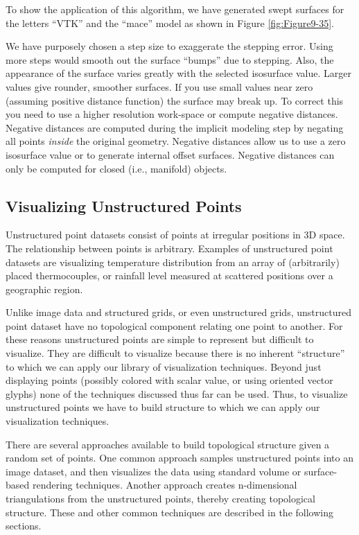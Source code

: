 To show the application of this algorithm, we have generated swept surfaces for the letters ``VTK'' and the ``mace'' model as shown in Figure \ref{fig:Figure9-35}.

We have purposely chosen a step size to exaggerate the stepping error. Using more steps would smooth out the surface ``bumps'' due to stepping. Also, the appearance of the surface varies greatly with the selected isosurface value. Larger values give rounder, smoother surfaces. If you use small values near zero (assuming positive distance function) the surface may break up. To correct this you need to use a higher resolution work-space or compute negative distances. Negative distances are computed during the implicit modeling step by negating all points \emph{inside} the original geometry. Negative distances allow us to use a zero isosurface value or to generate internal offset surfaces. Negative distances can only be computed for closed (i.e., manifold) objects.

\subsection{Visualizing Unstructured Points}
\label{subsec:visualizing_unstructured_points}

Unstructured point datasets consist of points at irregular positions in 3D space. The relationship between points is arbitrary. Examples of unstructured point datasets are visualizing temperature distribution from an array of (arbitrarily) placed thermocouples, or rainfall level measured at scattered positions over a geographic region.

Unlike image data and structured grids, or even unstructured grids, unstructured point dataset have no topological component relating one point to another. For these reasons unstructured points are simple to represent but difficult to visualize. They are difficult to visualize because there is no inherent ``structure'' to which we can apply our library of visualization techniques. Beyond just displaying points (possibly colored with scalar value, or using oriented vector glyphs) none of the techniques discussed thus far can be used. Thus, to visualize unstructured points we have to build structure to which we can apply our visualization techniques.

There are several approaches available to build topological structure given a random set of points. One common approach samples unstructured points into an image dataset, and then visualizes the data using standard volume or surface-based rendering techniques. Another approach creates n-dimensional triangulations from the unstructured points, thereby creating topological structure. These and other common techniques are described in the following sections.

